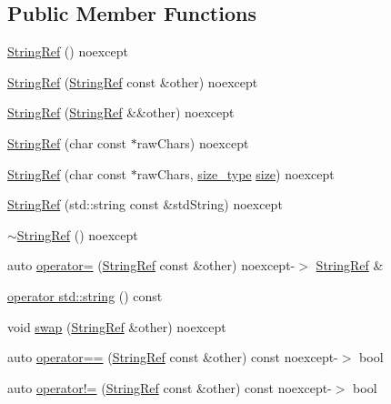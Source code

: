 \subsection*{Public Member Functions}
\begin{DoxyCompactItemize}
\item 
\hyperlink{class_catch_1_1_string_ref_a94319c75df6542327c93a312c6a80754}{String\-Ref} () noexcept
\item 
\hyperlink{class_catch_1_1_string_ref_a2f287267c3a988b288bfd910667c1cfc}{String\-Ref} (\hyperlink{class_catch_1_1_string_ref}{String\-Ref} const \&other) noexcept
\item 
\hyperlink{class_catch_1_1_string_ref_a407d5737b94e5a374add5c2794589733}{String\-Ref} (\hyperlink{class_catch_1_1_string_ref}{String\-Ref} \&\&other) noexcept
\item 
\hyperlink{class_catch_1_1_string_ref_aea45f5089c53adac362bff6bd7c40943}{String\-Ref} (char const $\ast$raw\-Chars) noexcept
\item 
\hyperlink{class_catch_1_1_string_ref_a320bf235274ebb90dd6af80485af2797}{String\-Ref} (char const $\ast$raw\-Chars, \hyperlink{class_catch_1_1_string_ref_a06b4db8fc82b197004291cf370b2ba7c}{size\-\_\-type} \hyperlink{class_catch_1_1_string_ref_aa370158c82397f443a16f96ab3133950}{size}) noexcept
\item 
\hyperlink{class_catch_1_1_string_ref_a7fe41469048f906e9a847798cd335f23}{String\-Ref} (std\-::string const \&std\-String) noexcept
\item 
\hyperlink{class_catch_1_1_string_ref_a387795c6d883d7281befe5e82920faf8}{$\sim$\-String\-Ref} () noexcept
\item 
auto \hyperlink{class_catch_1_1_string_ref_ac330bd7890310e9cab73a82cdfc1b7f4}{operator=} (\hyperlink{class_catch_1_1_string_ref}{String\-Ref} const \&other) noexcept-\/$>$ \hyperlink{class_catch_1_1_string_ref}{String\-Ref} \&
\item 
\hyperlink{class_catch_1_1_string_ref_a7f38055e84bb8d16e23490b2664bb319}{operator std\-::string} () const 
\item 
void \hyperlink{class_catch_1_1_string_ref_a8a843e39ad3560d10a80524ed926ed63}{swap} (\hyperlink{class_catch_1_1_string_ref}{String\-Ref} \&other) noexcept
\item 
auto \hyperlink{class_catch_1_1_string_ref_a04c84d944fb51b02552e7ce8de7dbbf0}{operator==} (\hyperlink{class_catch_1_1_string_ref}{String\-Ref} const \&other) const noexcept-\/$>$ bool
\item 
auto \hyperlink{class_catch_1_1_string_ref_a015f7b3adee8fe49ebb8172ae2975d21}{operator!=} (\hyperlink{class_catch_1_1_string_ref}{String\-Ref} const \&other) const noexcept-\/$>$ bool

\end{DoxyCompactItemize}
